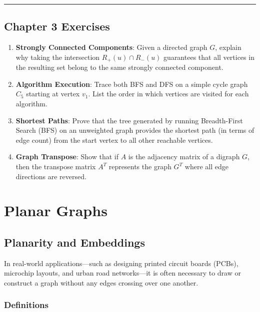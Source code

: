 \documentclass[
]{book}
\theoremstyle{definition}
\theoremstyle{definition}
\theoremstyle{definition}
\theoremstyle{definition}
\theoremstyle{remark}
\begin{document}
\begin{center}\rule{0.5\linewidth}{0.5pt}\end{center}

\section{Chapter 3 Exercises}\label{chapter-3-exercises}

\begin{enumerate}
\def\labelenumi{\arabic{enumi}.}
\item
  \textbf{Strongly Connected Components}: Given a directed graph \(G\), explain why taking the intersection \(R_+(u) \cap R_-(u)\) guarantees that all vertices in the resulting set belong to the same strongly connected component.
\item
  \textbf{Algorithm Execution}: Trace both BFS and DFS on a simple cycle graph \(C_5\) starting at vertex \(v_1\). List the order in which vertices are visited for each algorithm.
\item
  \textbf{Shortest Paths}: Prove that the tree generated by running Breadth-First Search (BFS) on an unweighted graph provides the shortest path (in terms of edge count) from the start vertex to all other reachable vertices.
\item
  \textbf{Graph Transpose}: Show that if \(A\) is the adjacency matrix of a digraph \(G\), then the transpose matrix \(A^T\) represents the graph \(G^T\) where all edge directions are reversed.
\end{enumerate}

\chapter{Planar Graphs}\label{planar-graphs}

\section{Planarity and Embeddings}\label{planarity-and-embeddings}

In real-world applications---such as designing printed circuit boards (PCBs), microchip layouts, and urban road networks---it is often necessary to draw or construct a graph without any edges crossing over one another.

\subsection{Definitions}\label{definitions-1}
\end{document}
